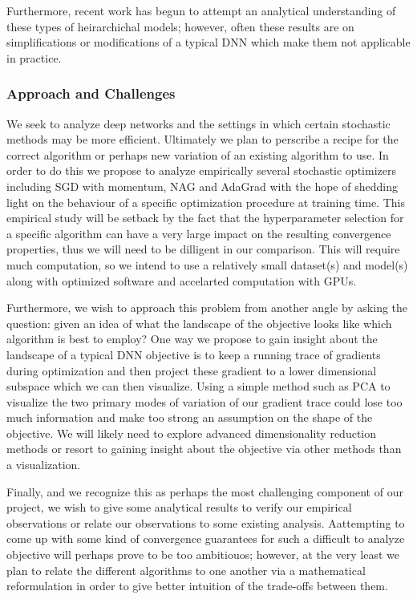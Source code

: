 \documentclass[12pt,english]{article}
\newcommand{\1}{\mathbb{I}} %
\begin{document}
Furthermore, recent work has begun to attempt an analytical understanding of
these types of heirarchichal models; however, often these results are on
simplifications or modifications of a typical DNN which make them not
applicable in practice. \cite{saxe_dl_dynamics} 

\subsubsection*{Approach and Challenges}

We seek to analyze deep networks and the settings in which certain stochastic
methods may be more efficient. Ultimately we plan to perscribe a recipe for the
correct algorithm or perhaps new variation of an existing algorithm to use. In
order to do this we propose to analyze empirically several stochastic
optimizers including SGD with momentum, NAG and AdaGrad with the hope of
shedding light on the behaviour of a specific optimization procedure at
training time. This empirical study will be setback by the fact that the
hyperparameter selection for a specific algorithm can have a very large impact
on the resulting convergence properties, thus we will need to be dilligent in
our comparison. This will require much computation, so we intend to use a
relatively small dataset(s) and model(s) along with optimized software and
accelarted computation with GPUs.

Furthermore, we wish to approach this problem from another angle by asking the
question: given an idea of what the landscape of the objective looks like which
algorithm is best to employ? One way we propose to gain insight about the
landscape of a typical DNN objective is to keep a running trace of gradients
during optimization and then project these gradient to a lower dimensional
subspace which we can then visualize.  Using a simple method such as PCA to
visualize the two primary modes of variation of our gradient trace could lose
too much information and make too strong an assumption on the shape of the
objective. We will likely need to explore advanced dimensionality reduction
methods or resort to gaining insight about the objective via other methods than
a visualization.

Finally, and we recognize this as perhaps the most challenging component of our
project, we wish to give some analytical results to verify our empirical
observations or relate our observations to some existing analysis. Aattempting
to come up with some kind of convergence guarantees for such a difficult to
analyze objective will perhaps prove to be too ambitiouos; however, at the very
least we plan to relate the different algorithms to one another via a
mathematical reformulation in order to give better intuition of the trade-offs
between them.

{}

\end{document}
